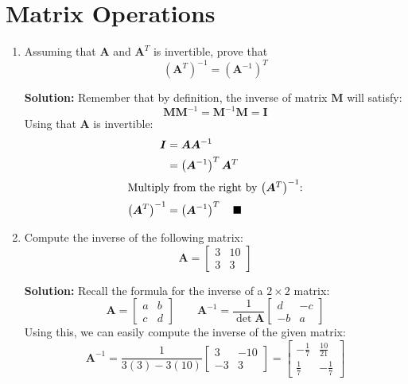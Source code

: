 \documentclass[letterpaper, 11pt]{article}
\begin{document}
\section{Matrix Operations}
\begin{enumerate}
\item Assuming that $\bm{A}$ and $\bm{A}^T$ is invertible, prove that 
\[ (\bm{A}^T)^{-1} = (\bm{A}^{-1})^T \]
\par \textbf{Solution:} Remember that by definition, the inverse of matrix $\bm{M}$ will satisfy:
\[ \bm{M}\bm{M}^{-1} = \bm{M}^{-1} \bm{M} = \bm{I} \]
Using that $\bm{A}$ is invertible:
\begin{align*}
\bm{I} &= \bm{A} \bm{A}^{-1} \\
&= \left( \bm{A}^{-1}\right)^T \bm{A}^T \\
\intertext{Multiply from the right by $\left(\bm{A}^T\right)^{-1}$:}
\left( \bm{A}^T\right)^{-1} &= \left( \bm{A}^{-1}\right)^T \quad\blacksquare
\end{align*}


\item Compute the inverse of the following matrix:
\[ \bm{A} = \left[ \begin{array}{cc} 3 & 10 \\ 3 & 3 \end{array} \right] \]
\par \textbf{Solution:} Recall the formula for the inverse of a $2 \times 2$ matrix:
\[ \bm{A} = \left[ \begin{array}{cc} a & b \\ c & d \end{array} \right] \qquad \bm{A}^{-1} =\frac{1}{\det\bm{A}} \left[\begin{array}{cc} d & -c \\ -b & a \end{array} \right] \]
Using this, we can easily compute the inverse of the given matrix:
\[ \bm{A}^{-1} = \frac{1}{3(3) - 3(10)} \left[ \begin{array}{cc} 3 & -10 \\ -3 & 3 \end{array} \right] = \left[ \begin{array}{cc} - \frac{1}{7} & \frac{10}{21} \\ \frac{1}{7} & -\frac{1}{7}\end{array} \right] \]


\end{enumerate}
\end{document}
